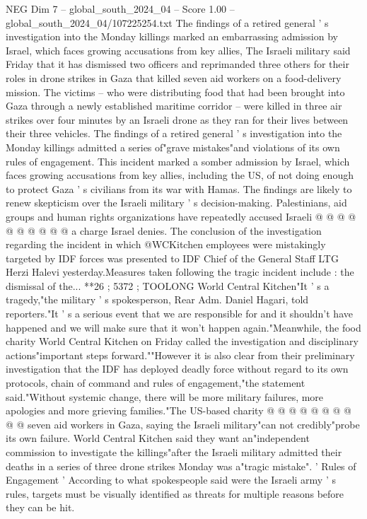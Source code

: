 \begin{textsample}{NEG Dim 7 – global\_south\_2024\_04 – Score 1.00 – global\_south\_2024\_04/107225254.txt}  \label{ex:f7_neg_287}
The findings of a retired general ' s investigation into the Monday killings marked an embarrassing admission by Israel, which faces growing accusations from key allies, The Israeli military said Friday that it has dismissed two officers and reprimanded three others for their roles in drone strikes in Gaza that killed seven aid workers on a food-delivery mission.
The victims -- who were distributing food that had been brought into Gaza through a newly established maritime corridor -- were killed in three air strikes over four minutes by an Israeli drone as they ran for their lives between their three vehicles.
The findings of a retired general ' s investigation into the Monday killings admitted a series of"grave mistakes"and violations of its own rules of engagement.
This incident marked a somber admission by Israel, which faces growing accusations from key allies, including the US, of not doing enough to protect Gaza ' s civilians from its war with Hamas.
The findings are likely to renew skepticism over the Israeli military ' s decision-making.
Palestinians, aid groups and human rights organizations have repeatedly accused Israeli @ @ @ @ @ @ @ @ @ @ a charge Israel denies.
The conclusion of the investigation regarding the incident in which @WCKitchen employees were mistakingly targeted by IDF forces was presented to IDF Chief of the General Staff LTG Herzi Halevi yesterday.Measures taken following the tragic incident include : the dismissal of the... **26 ; 5372 ; TOOLONG World Central Kitchen"It ' s a tragedy,"the military ' s spokesperson, Rear Adm.
Daniel Hagari, told reporters."It ' s a serious event that we are responsible for and it shouldn't have happened and we will make sure that it won't happen again."Meanwhile, the food charity World Central Kitchen on Friday called the investigation and disciplinary actions"important steps forward.""However it is also clear from their preliminary investigation that the IDF has deployed deadly force without regard to its own protocols, chain of command and rules of engagement,"the statement said."Without systemic change, there will be more military failures, more apologies and more grieving families."The US-based charity @ @ @ @ @ @ @ @ @ @ seven aid workers in Gaza, saying the Israeli military"can not credibly"probe its own failure.
World Central Kitchen said they want an"independent commission to investigate the killings"after the Israeli military admitted their deaths in a series of three drone strikes Monday was a"tragic mistake". ' Rules of Engagement ' According to what spokespeople said were the Israeli army ' s rules, targets must be visually identified as threats for multiple reasons before they can be hit.

\end{textsample}
